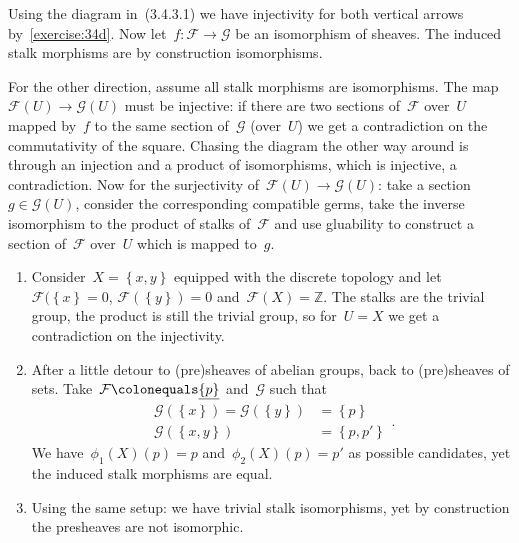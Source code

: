 \begin{exercise}
  Using the diagram in~(3.4.3.1) we have injectivity for both vertical arrows by~\autoref{exercise:34d}. Now let~$f\colon\mathcal{F}\to\mathcal{G}$ be an isomorphism of sheaves. The induced stalk morphisms are by construction isomorphisms.

  For the other direction, assume all stalk morphisms are isomorphisms. The map~$\mathcal{F}(U)\to\mathcal{G}(U)$ must be injective: if there are two sections of~$\mathcal{F}$ over~$U$ mapped by~$f$ to the same section of~$\mathcal{G}$ (over~$U$) we get a contradiction on the commutativity of the square. Chasing the diagram the other way around is through an injection and a product of isomorphisms, which is injective, a contradiction. Now for the surjectivity of~$\mathcal{F}(U)\to\mathcal{G}(U)$: take a section~$g\in\mathcal{G}(U)$, consider the corresponding compatible germs, take the inverse isomorphism to the product of stalks of~$\mathcal{F}$ and use gluability to construct a section of~$\mathcal{F}$ over~$U$ which is mapped to~$g$.
\end{exercise}

\begin{exercise}
  \begin{enumerate}
    \item Consider~$X=\left\{ x,y \right\}$ equipped with the discrete topology and let~$\mathcal{F}(\left\{ x \right\}=0$, $\mathcal{F}(\left\{ y \right\})=0$ and~$\mathcal{F}(X)=\mathbb{Z}$. The stalks are the trivial group, the product is still the trivial group, so for~$U=X$ we get a contradiction on the injectivity.

    \item After a little detour to (pre)sheaves of abelian groups, back to (pre)sheaves of sets. Take~$\mathcal{F}\colonequals\underline{\left\{ p \right\}}$ and~$\mathcal{G}$ such that
      \begin{equation}
        \begin{aligned}
          \mathcal{G}(\left\{ x \right\})=\mathcal{G}(\left\{ y \right\})&=\left\{ p \right\}    \\
          \mathcal{G}(\left\{ x,y \right\})&=\left\{ p,p' \right\}
        \end{aligned}.
      \end{equation}
      We have~$\phi_1(X)(p)=p$ and~$\phi_2(X)(p)=p'$ as possible candidates, yet the induced stalk morphisms are equal.

    \item Using the same setup: we have trivial stalk isomorphisms, yet by construction the presheaves are not isomorphic.
  \end{enumerate}
\end{exercise}

